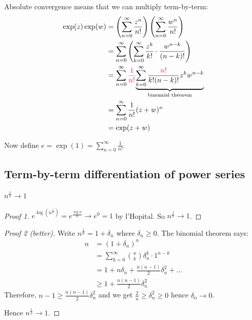 \documentclass[12pt]{article}
\begin{document}
Absolute convergence means that we can multiply term-by-term:
\begin{align*}
    \exp(z)\exp(w) & = \left(\sum_{n=0}^{\infty}\frac{z^n}{n!}\right)\left(\sum_{n=0}^{\infty}\frac{w^n}{n!}\right)\\
    &= \sum_{n=0}^{\infty}\left(\sum_{k=0}^{\infty}\frac{z^k}{k!}\cdot\frac{w^{n-k}}{(n-k)!}\right)\\
    &= \sum_{n=0}^{\infty}\textcolor{magenta}{\frac{1}{n!}}\underset{\text{binomial theorem}}{\underbrace{\sum_{k=0}^{\infty}\frac{\textcolor{magenta}{n!}}{k!(n-k)!}z^kw^{n-k}}}\\
    &= \sum_{n=0}^{\infty}{\frac{1}{n!}}(z+w)^n\\
    &= \exp(z+w)
\end{align*}

Now define $e=\exp(1)=\sum_{n=0}^{\infty}\frac{1}{n!}$.

\subsection{Term-by-term differentiation of power series}

\begin{lemma}
    $n^{\frac{1}{n}}\to 1$
\end{lemma}
\begin{proof}[Proof 1] $e^{\log (n^{\frac{1}{n}})}=e^{\frac{\log n}{n}}\to e^{0}=1$ by l'Hopital. So $n^{\frac{1}{n}}\to 1$.
\end{proof}
\begin{proof}[Proof 2 (better)] Write $n^{\frac{1}{n}}=1+\delta_n$ where $\delta_n\geq 0$. The binomial theorem says:
\begin{align*}
    n&= (1+\delta_n)^n\\
    &= \sum_{k=0}^{\infty}{n\choose k}\delta_n^k\cdot 1^{n-k}\\
    &= 1+n\delta_n+\frac{n(n-1)}{2}\delta_n^2+\dots\\
    &\geq 1+\frac{n(n-1)}{2}\delta_n^2
\end{align*}
    Therefore, $n-1\geq \frac{n(n-1)}{2}\delta_n^2$ and we get $\frac{2}{n}\geq \delta_n^2\geq 0$ hence $\delta_n\to 0$.

    Hence $n^{\frac{1}{n}}\to 1$.
\end{proof}
\end{document}
